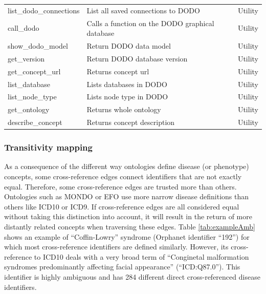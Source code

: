 \documentclass[9pt,a4paper,]{extarticle}
\begin{document}
\begin{table}
{\begin{tabular}[t]{lll}
\rowcolor{gray!6}  list\_dodo\_connections & List all saved connections to DODO & Utility\\
call\_dodo & Calls a function on the DODO graphical database & Utility\\
\rowcolor{gray!6}  show\_dodo\_model & Return DODO data model & Utility\\
get\_version & Return DODO database version & Utility\\
\addlinespace
\rowcolor{gray!6}  get\_concept\_url & Returns concept url & Utility\\
list\_database & Lists databases in DODO & Utility\\
\rowcolor{gray!6}  list\_node\_type & Lists node type in DODO & Utility\\
get\_ontology & Returns whole ontology & Utility\\
\rowcolor{gray!6}  describe\_concept & Returns concept description & Utility\\
\bottomrule
\end{tabular}}
\end{table}

\hypertarget{transitivity-mapping}{%
\subsubsection{Transitivity mapping}\label{transitivity-mapping}}

As a consequence of the different way ontologies define disease (or phenotype) concepts, some cross-reference edges connect identifiers that are not exactly equal. Therefore, some cross-reference edges are trusted more than others. Ontologies such as MONDO or EFO use more narrow disease definitions than others like ICD10 or ICD9. If cross-reference edges are all considered equal without taking this distinction into account, it will result in the return of more distantly related concepts when traversing these edges. Table \ref{tab:exampleAmb} shows an example of ``Coffin-Lowry'' syndrome (Orphanet identifier ``192'') for which most cross-reference identifiers are defined similarly. However, its cross-reference to ICD10 deals with a very broad term of ``Conginetal malformation syndromes predominantly affecting facial appearance'' (``ICD:Q87.0''). This identifier is highly ambiguous and has 284 different direct cross-referenced disease identifiers.
\end{document}
